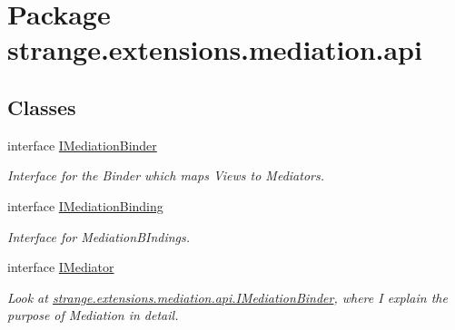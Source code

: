 \hypertarget{namespacestrange_1_1extensions_1_1mediation_1_1api}{\section{Package strange.\-extensions.\-mediation.\-api}
\label{namespacestrange_1_1extensions_1_1mediation_1_1api}
}
\subsection*{Classes}
\begin{DoxyCompactItemize}
\item 
interface \hyperlink{interfacestrange_1_1extensions_1_1mediation_1_1api_1_1_i_mediation_binder}{I\-Mediation\-Binder}
\begin{DoxyCompactList}\small\item\em Interface for the Binder which maps Views to Mediators. \end{DoxyCompactList}\item 
interface \hyperlink{interfacestrange_1_1extensions_1_1mediation_1_1api_1_1_i_mediation_binding}{I\-Mediation\-Binding}
\begin{DoxyCompactList}\small\item\em Interface for Mediation\-B\-Indings. \end{DoxyCompactList}\item 
interface \hyperlink{interfacestrange_1_1extensions_1_1mediation_1_1api_1_1_i_mediator}{I\-Mediator}
\begin{DoxyCompactList}\small\item\em Look at \hyperlink{interfacestrange_1_1extensions_1_1mediation_1_1api_1_1_i_mediation_binder}{strange.\-extensions.\-mediation.\-api.\-I\-Mediation\-Binder}, where I explain the purpose of Mediation in detail. \end{DoxyCompactList}\end{DoxyCompactItemize}
